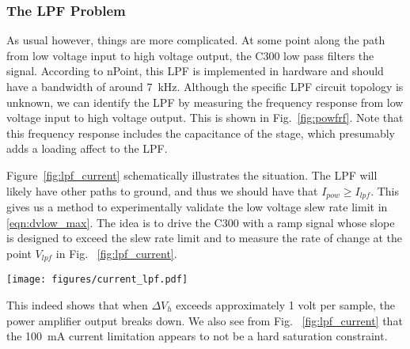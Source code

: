 \documentclass[journal,12pt,twocolumn,twoside]{IEEEtran/IEEEtran}
\begin{document}
\subsubsection{The LPF Problem}
As usual however, things are more complicated. At some point along the path from low voltage input to high voltage output, the C300 low pass filters the signal. According to nPoint, this LPF is implemented in hardware and should have a bandwidth of around 7~kHz. Although the specific LPF circuit topology is unknown, we can identify the LPF by measuring the frequency response from low voltage input to high voltage output. This is shown in Fig.~\ref{fig:powfrf}. Note that this frequency response includes the capacitance of the stage, which presumably adds a loading affect to the LPF.

Figure~\ref{fig:lpf_current} schematically illustrates the situation. The LPF will likely have other paths to ground, and thus we should have that $I_{pow} \geq I_{lpf}$. This gives us a method to experimentally validate the low voltage slew rate limit in \eqref{eqn:dvlow_max}. The idea is to drive the C300 with a ramp signal whose slope is designed to exceed the slew rate limit and to measure the rate of change at the point $V_{lpf}$ in Fig. ~\ref{fig:lpf_current}. 
\begin{figure*}
  \begin{minipage}{0.4\textwidth}
    \texttt{[image: figures/current\_lpf.pdf]}
    \caption{Schematic representation of  LPF.}
    \label{fig:lpf_current}
  \end{minipage}
\hfill
  \begin{minipage}{0.6\textwidth}
    
    \caption{Schematic representation of  LPF.}
    \label{fig:lpf_current}
  \end{minipage}
\end{figure*}
This indeed shows that when $\Delta V_h$ exceeds approximately 1 volt per sample, the power amplifier output breaks down. We also see from Fig. ~\ref{fig:lpf_current} that the 100~mA current limitation appears to not be a hard saturation constraint. 



\end{document}
